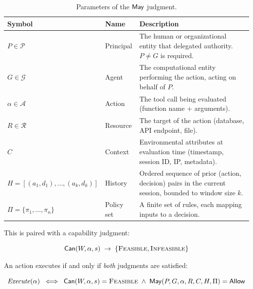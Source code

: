 \documentclass[11pt,a4paper]{article}
\newcommand{\termlabel}[1]{\ifmmode\mathsf{#1}\else{\normalfont\textsc{\MakeLowercase{#1}}}\fi}
\newcommand{\May}{\termlabel{May}}
\newcommand{\Can}{\termlabel{Can}}
\newcommand{\Allow}{\termlabel{Allow}}
\begin{document}
\begin{table}[!ht]
\centering
\caption{Parameters of the $\May$ judgment.}
\label{tab:may-params}
\small
\begin{tabularx}{\textwidth}{@{}l l X@{}}
\toprule
\textbf{Symbol} & \textbf{Name} & \textbf{Description} \\
\midrule
$P \in \mathcal{P}$ & Principal & The human or organizational entity that delegated authority. $P \neq G$ is required. \\
$G \in \mathcal{G}$ & Agent & The computational entity performing the action, acting on behalf of $P$. \\
$\alpha \in \mathcal{A}$ & Action & The tool call being evaluated (function name + arguments). \\
$R \in \mathcal{R}$ & Resource & The target of the action (database, API endpoint, file). \\
$C$ & Context & Environmental attributes at evaluation time (timestamp, session ID, IP, metadata). \\
$H = [(a_1, d_1), \ldots, (a_k, d_k)]$ & History & Ordered sequence of prior (action, decision) pairs in the current session, bounded to window size $k$. \\
$\Pi = \{\pi_1, \ldots, \pi_n\}$ & Policy set & A finite set of rules, each mapping inputs to a decision. \\
\bottomrule
\end{tabularx}
\end{table}

This is paired with a capability judgment:

\begin{equation}
\Can(W, \alpha, s) \;\to\; \{\textsc{Feasible}, \textsc{Infeasible}\}
\label{eq:can}
\end{equation}

\noindent An action executes if and only if \emph{both} judgments are satisfied:

\begin{equation}
\mathit{Execute}(\alpha) \;\iff\; \Can(W, \alpha, s) = \textsc{Feasible} \;\wedge\; \May(P, G, \alpha, R, C, H, \Pi) = \Allow
\label{eq:execute}
\end{equation}
\end{document}
